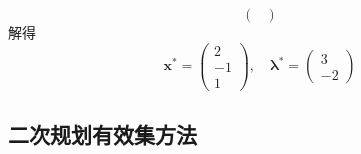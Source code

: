 \begin{example}
\begin{solution}
\[\begin{pmatrix}
                \end{pmatrix}
            \]
            解得
            \[
                \boldsymbol{x}^{*}=
                \begin{pmatrix}
                    {2}\\{-1}\\{1}
                \end{pmatrix}
                ,\quad\boldsymbol{\lambda}^{*}=
                \begin{pmatrix}
                    {3}\\{-2}
                \end{pmatrix}
            \]
    \end{solution}
\end{example}
\subsection{二次规划有效集方法}
